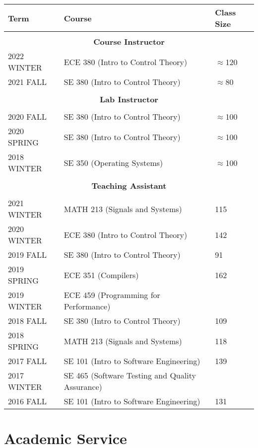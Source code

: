 \documentclass[oneside, 10pt]{memoir}
\begin{document}
\begin{longtable}{l|l|l}
    \textbf{Term} & \textbf{Course} & \textbf{Class Size}\\ \hline\hline
    & & \\\hline
    \multicolumn{3}{c}{\textbf{Course Instructor}}\\\hline
    {2022 WINTER} & {ECE 380 (Intro to Control Theory)} & \(\approx\)120\\
    {2021 FALL  } & {SE 380 (Intro to Control Theory)} & \(\approx\)80\\
    & & \\\hline
    \multicolumn{3}{c}{\textbf{Lab Instructor}}\\\hline
    & & \\
    {2020 FALL  } & {SE 380 (Intro to Control Theory)} & \(\approx\)100\\
    {2020 SPRING} & {SE 380 (Intro to Control Theory)} & \(\approx\)100\\
    {2018 WINTER} & {SE 350 (Operating Systems)} & \(\approx\)100\\
    & & \\\hline
    \multicolumn{3}{c}{\textbf{Teaching Assistant}}\\\hline
    & & \\
    {2021 WINTER} & {MATH 213 (Signals and Systems)} & 115\\
    {2020 WINTER} & {ECE 380 (Intro to Control Theory)} & 142\\
    {2019 FALL  } & {SE 380 (Intro to Control Theory)} & 91\\
    {2019 SPRING} & {ECE 351 (Compilers)} & 162\\
    {2019 WINTER} & {ECE 459 (Programming for Performance)} & \\
    {2018 FALL  } & {SE 380 (Intro to Control Theory)} & 109\\
    {2018 SPRING} & {MATH 213 (Signals and Systems)} & 118\\
    {2017 FALL  } & {SE 101 (Intro to Software Engineering)} & 139\\
    {2017 WINTER} & {SE 465 (Software Testing and Quality Assurance)} & \\
    {2016 FALL  } & {SE 101 (Intro to Software Engineering)} & 131
\end{longtable}

\section*{Academic Service}
\end{document}
